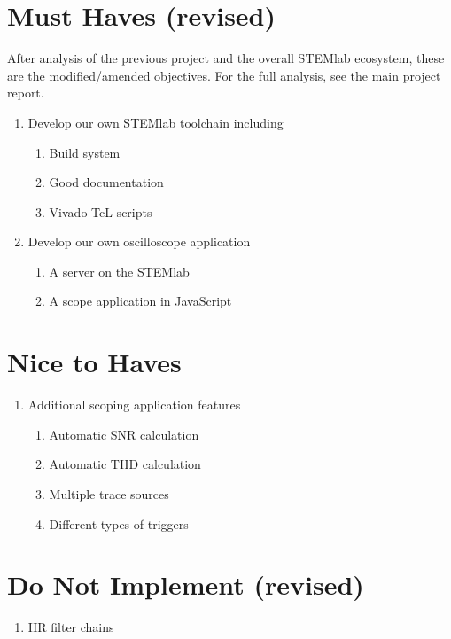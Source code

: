 \documentclass[a4paper,oneside]{alpenspecs/alpenspecs}
\begin{document}
\clearpage
\section{Must Haves (revised)}

After  analysis of  the previous  project and  the overall  STEMlab ecosystem,
these are the modified/amended objectives. For the full analysis, see the main
project report.

\begin{enumerate}
    \item Develop our own STEMlab toolchain including
    \begin{enumerate}
        \item Build system
        \item Good documentation
        \item Vivado TcL scripts
    \end{enumerate}
    \item Develop our own oscilloscope application
    \begin{enumerate}
        \item A server on the STEMlab
        \item A scope application in JavaScript
    \end{enumerate}
\end{enumerate}

\section{Nice to Haves}
\begin{enumerate}
    \item Additional scoping application features
    \begin{enumerate}
        \item Automatic SNR calculation
        \item Automatic THD calculation
        \item Multiple trace sources
        \item Different types of triggers
    \end{enumerate}
\end{enumerate}

\section{Do Not Implement (revised)}

\begin{enumerate}
    \item IIR filter chains
\end{enumerate}
\end{document}
